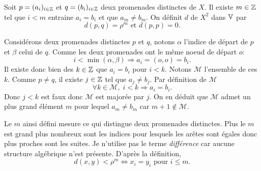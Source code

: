 \begin{defin}
 Soit $p = (a_i)_{i\in \mathbb{Z}}$ et $q = (b_i)_{i\in \mathbb{Z}}$ deux promenades distinctes de $X$. Il existe $m\in \mathbb{Z}$ tel que $i<m$ entraine $a_i=b_i$ et que $a_m \neq b_m$.
 On définit $d$ de $X^2$ dans $\mathbb{V}$ par
 \begin{displaymath}
  d(p,q) = \rho^m \text{ et } d(p,p) = 0.
 \end{displaymath}
\end{defin}
\begin{demo}
 Considérons deux promenades distinctes $p$ et $q$, notons $\alpha$ l'indice de départ de $p$ et $\beta$ celui de $q$. Comme les deux promenades ont le même noeud de départ $o$:
 \begin{displaymath}
  i < \min(\alpha, \beta) \Rightarrow a_i = (o,o) = b_i.
 \end{displaymath}
Il existe donc bien des $k \in \mathbb{Z}$ que $a_i=b_i$ pour $i<k$. Notons $\mathcal{M}$ l'ensemble de ces $k$.\newline
Comme $p\neq q$, il existe $j\in \mathbb{Z}$ tel que $a_j \neq b_j$. Par définition de $\mathcal{M}$
\begin{displaymath}
 \forall k \in \mathcal{M},\; i < k \Rightarrow a_i = b_i.
\end{displaymath}
Donc $j < k$ est faux donc $\mathcal{M}$ est majorée par $j$. On en déduit que $\mathcal{M}$ admet un plus grand élément $m$ pour lequel $a_m \neq b_m$ car $m+1 \notin \mathcal{M}$.
\end{demo}
\begin{rem}
 Le $m$ ainsi défini mesure ce qui distingue deux promenades distinctes. Plus le $m$ est grand plus nombreux sont les indices pour lesquels les arêtes sont égales donc plus proches sont les suites. Je n'utilise pas le terme \emph{différence} car aucune structure algébrique n'est présente.  D'après la définition,
 \begin{displaymath}
  d(x,y) < \rho^m \Leftrightarrow x_i = y_i \text{ pour } i \leq m.
 \end{displaymath}
\end{rem}

